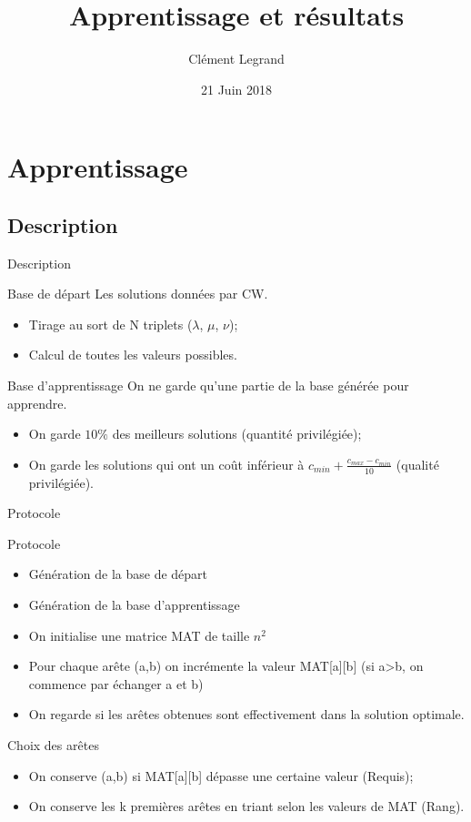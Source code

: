 \documentclass{beamer}
\title{Apprentissage et résultats}
\author{Clément Legrand}
\date{21 Juin 2018}
\begin{document}
\begin{frame}[plain]
\titlepage
\end{frame}

\section{Apprentissage}

\subsection{Description}

\begin{frame}{Description}
\begin{block}{Base de départ}
Les solutions données par CW.
\begin{itemize}
\item Tirage au sort de N triplets ($\lambda$, $\mu$, $\nu$);
\item Calcul de toutes les valeurs possibles.
\end{itemize}
\end{block}

\begin{block}{Base d'apprentissage}
On ne garde qu'une partie de la base générée pour apprendre.
\begin{itemize}
\item On garde $10\%$ des meilleurs solutions (quantité privilégiée);
\item On garde les solutions qui ont un coût inférieur à $c_{min} + \frac{c_{max}-c_{min}}{10}$ (qualité privilégiée).
\end{itemize}
\end{block}
\end{frame}

\begin{frame}{Protocole}

\begin{exampleblock}{Protocole}
\begin{itemize}
\item Génération de la base de départ
\item Génération de la base d'apprentissage
\item On initialise une matrice MAT de taille $n^2$
\item Pour chaque arête (a,b) on incrémente la valeur MAT[a][b] (si a>b, on commence par échanger a et b)
\item On regarde si les arêtes obtenues sont effectivement dans la solution optimale.
\end{itemize}
\end{exampleblock}

\begin{block}{Choix des arêtes}
\begin{itemize}
\item On conserve (a,b) si MAT[a][b] dépasse une certaine valeur (Requis);
\item On conserve les k premières arêtes en triant selon les valeurs de MAT (Rang).
\end{itemize}
\end{block}

\end{frame}
\end{document}

